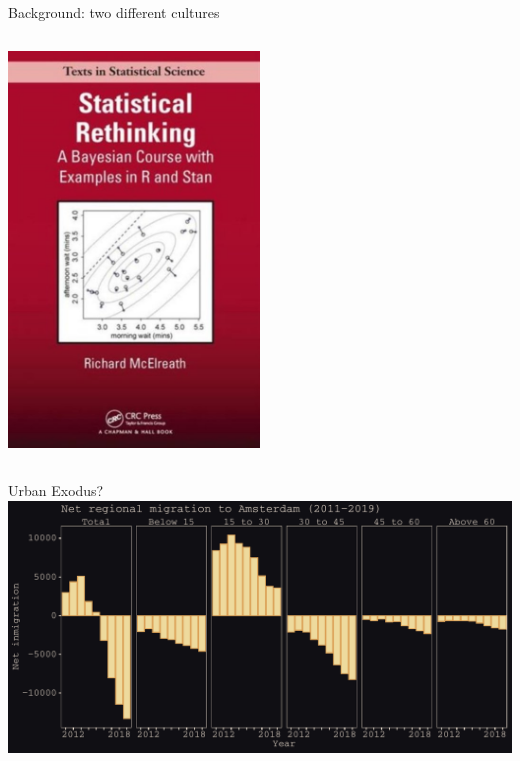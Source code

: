 \documentclass{beamer}
\begin{document}
\begin{frame}{Background: two different cultures \footnotesize{\citep{breiman2001statistical}} }
\begin{columns}
\begin{column}{0.5\textwidth}
\begin{center}
			\includegraphics[width=0.5\textwidth]{../../fig/rethinking}
		\end{center}
	\end{column}
\end{columns}
\end{frame}

\begin{frame}{Urban Exodus?}
  \includegraphics[width=1.0\textwidth]{../../fig/outmig_amsterdam.pdf}
\end{frame}
\end{document}
